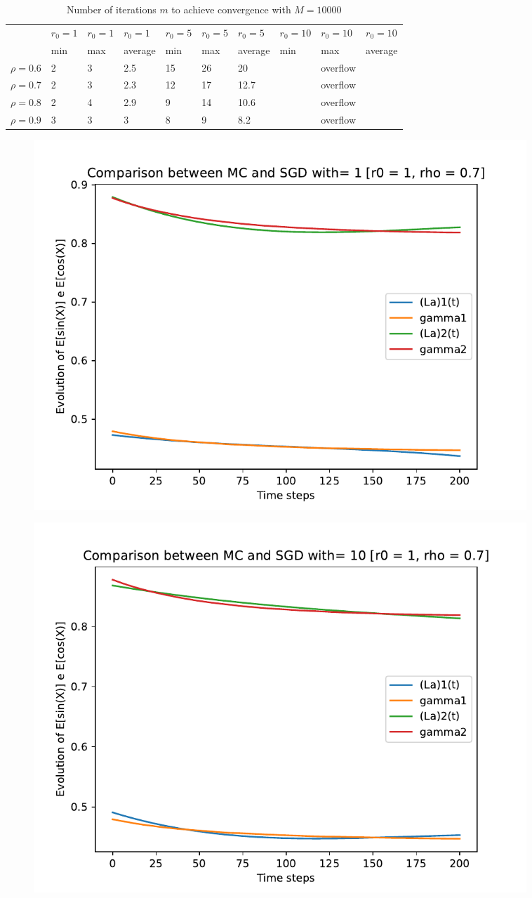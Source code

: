 \documentclass[a4paper,11pt,openright]{report}
\begin{document}
\begin{table}[H]
\centering
\addtolength{\leftskip}{-1.5cm}
\addtolength{\rightskip}{-1.5cm}
\begin{tabular}{|c|lllllllll|}
\hline
$ $ & $r_0 = 1$ & $r_0 = 1$ & $r_0 = 1$ & $r_0 = 5$ & $r_0 = 5$ & $r_0 = 5$ & $r_0 = 10$ & $r_0 = 10$ & $r_0 = 10$  \\
$ $ & min & max & average & min & max & average & min & max & average \\ 
\hline
$\rho = 0.6$ & 2 & 3 & 2.5 & 15 & 26 & 20 &  & overflow &  \\

$\rho = 0.7$ & 2 & 3 & 2.3 & 12 & 17 & 12.7 &  & overflow &  \\

$\rho = 0.8$ & 2 & 4 & 2.9 & 9 & 14 & 10.6 &  & overflow & \\

$\rho = 0.9$ & 3 & 3 & 3 & 8 & 9 & 8.2 &  & overflow & \\
\hline
\end{tabular}
\caption{Number of iterations $m$ to achieve convergence with $M = 10000$}
\end{table}
\begin{figure}[H]
\centering
\includegraphics[width=0.9\textwidth]{images/graphs T = 2/n = 3, M = 1 sine and cosine.pdf}
\end{figure}
\begin{figure}[H]
\centering
\includegraphics[width=0.9\textwidth]{images/graphs T = 2/n = 3, M = 10 sine and cosine.pdf}
\end{figure}
\end{document}
